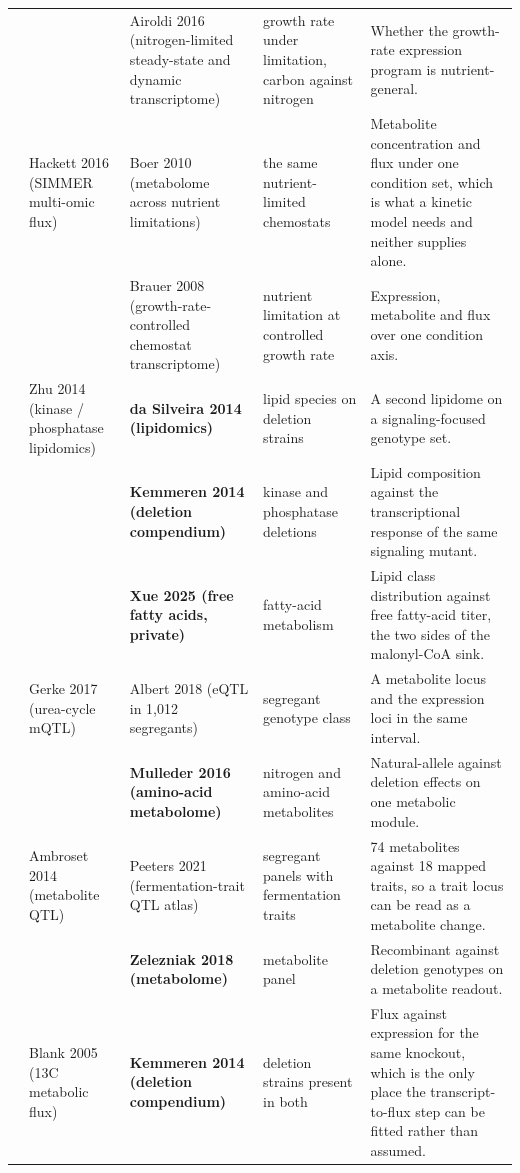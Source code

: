 \begin{landscape}
\begin{longtable}{@{}r@{\hspace{4pt}} L{42mm} L{44mm} L{48mm} L{96mm}@{}}
 &  & Airoldi 2016 (nitrogen-limited steady-state and dynamic transcriptome) & growth rate under limitation, carbon against nitrogen & Whether the growth-rate expression program is nutrient-general. \\
 & Hackett 2016 (SIMMER multi-omic flux) & Boer 2010 (metabolome across nutrient limitations) & the same nutrient-limited chemostats & Metabolite concentration and flux under one condition set, which is what a kinetic model needs and neither supplies alone. \\
 &  & Brauer 2008 (growth-rate-controlled chemostat transcriptome) & nutrient limitation at controlled growth rate & Expression, metabolite and flux over one condition axis. \\
 & Zhu 2014 (kinase / phosphatase lipidomics) & \textbf{da Silveira 2014 (lipidomics)} & lipid species on deletion strains & A second lipidome on a signaling-focused genotype set. \\
 &  & \textbf{Kemmeren 2014 (deletion compendium)} & kinase and phosphatase deletions & Lipid composition against the transcriptional response of the same signaling mutant. \\
 &  & \textbf{Xue 2025 (free fatty acids, private)} & fatty-acid metabolism & Lipid class distribution against free fatty-acid titer, the two sides of the malonyl-CoA sink. \\
 & Gerke 2017 (urea-cycle mQTL) & Albert 2018 (eQTL in 1,012 segregants) & segregant genotype class & A metabolite locus and the expression loci in the same interval. \\
 &  & \textbf{Mulleder 2016 (amino-acid metabolome)} & nitrogen and amino-acid metabolites & Natural-allele against deletion effects on one metabolic module. \\
 & Ambroset 2014 (metabolite QTL) & Peeters 2021 (fermentation-trait QTL atlas) & segregant panels with fermentation traits & 74 metabolites against 18 mapped traits, so a trait locus can be read as a metabolite change. \\
 &  & \textbf{Zelezniak 2018 (metabolome)} & metabolite panel & Recombinant against deletion genotypes on a metabolite readout. \\
 & Blank 2005 (13C metabolic flux) & \textbf{Kemmeren 2014 (deletion compendium)} & deletion strains present in both & Flux against expression for the same knockout, which is the only place the transcript-to-flux step can be fitted rather than assumed. \\

\end{longtable}
\end{landscape}

